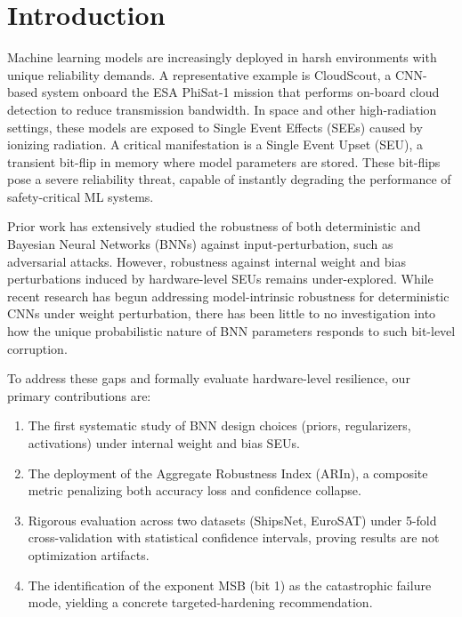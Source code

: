 \documentclass[a4paper,twoside]{article}
\begin{document}
\onecolumn \maketitle \normalsize \setcounter{footnote}{0} \vfill

\section{Introduction}
\label{sec:introduction}

Machine learning models are increasingly deployed in harsh environments with unique reliability demands. A representative example is CloudScout, a CNN-based system onboard the ESA PhiSat-1 mission that performs on-board cloud detection to reduce transmission bandwidth. In space and other high-radiation settings, these models are exposed to Single Event Effects (SEEs) caused by ionizing radiation. A critical manifestation is a Single Event Upset (SEU), a transient bit-flip in memory where model parameters are stored. These bit-flips pose a severe reliability threat, capable of instantly degrading the performance of safety-critical ML systems.

Prior work has extensively studied the robustness of both deterministic and Bayesian Neural Networks (BNNs) against input-perturbation, such as adversarial attacks. However, robustness against internal weight and bias perturbations induced by hardware-level SEUs remains under-explored. While recent research has begun addressing model-intrinsic robustness for deterministic CNNs under weight perturbation, there has been little to no investigation into how the unique probabilistic nature of BNN parameters responds to such bit-level corruption.

To address these gaps and formally evaluate hardware-level resilience, our primary contributions are:
\begin{enumerate}
    \item The first systematic study of BNN design choices (priors, regularizers, activations) under internal weight and bias SEUs.
    \item The deployment of the Aggregate Robustness Index (ARIn), a composite metric penalizing both accuracy loss and confidence collapse.
    \item Rigorous evaluation across two datasets (ShipsNet, EuroSAT) under 5-fold cross-validation with statistical confidence intervals, proving results are not optimization artifacts.
    \item The identification of the exponent MSB (bit 1) as the catastrophic failure mode, yielding a concrete targeted-hardening recommendation.
\end{enumerate}
\end{document}
